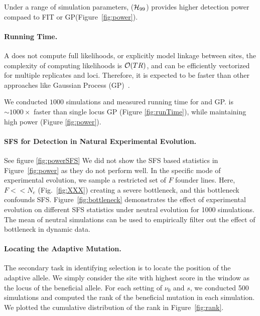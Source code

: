 \documentclass[11pt]{article}
\def\comale{\text{COMALE }}
\begin{document}
Under a range of simulation parameters, \comale(${\cal H}_{99}$)
provides higher detection power compaed to FIT or
GP(Figure~\ref{fig:power}).

\paragraph{Running Time.}
A \comale does not compute full likelihoods, or explicitly model
linkage between sites, the complexity of computing likelihoods is
${\cal O}(TR)$, and can be efficiently vectorized for multiple replicates
and loci. Therefore, it is expected to be faster than other approaches
like Gaussian Process (GP)~\cite{Terhorst2015Multi}.

We conducted $1000$ simulations and measured running time for \comale
and GP. \comale is $\sim 1000\times$ faster than single locus GP
(Figure \ref{fig:runTime}), while maintaining high power (Figure
\ref{fig:power}). 



\paragraph{SFS for Detection in Natural Experimental Evolution.} See
figure \ref{fig:powerSFS} We did not show the SFS based statistics in
Figure~\ref{fig:power} as they do not perform well. In the specific
mode of experimental evolution, we sample a restricted set of $F$
founder lines. Here, $F<<N_e$ (Fig.~\ref{fig:XXX}) creating a severe
bottleneck, and this bottleneck confounds
SFS. Figure~\ref{fig:bottleneck} demonstrates the effect of
experimental evolution on different SFS statistics under neutral
evolution for 1000 simulations. The mean of neutral simulations can be
used to empirically filter out the effect of bottleneck in dynamic
data.


\paragraph{Locating the Adaptive Mutation.}
The secondary task in identifying selection is to locate the position
of the adaptive allele. We simply consider the site with highest score
in the window as the locus of the beneficial allele. For each setting
of $\nu_0$ and $s$, we conducted 500 simulations
and computed the rank of the beneficial mutation in each
simulation. We plotted the cumulative distribution of the rank in
Figure~\ref{fig:rank}.
\end{document}
